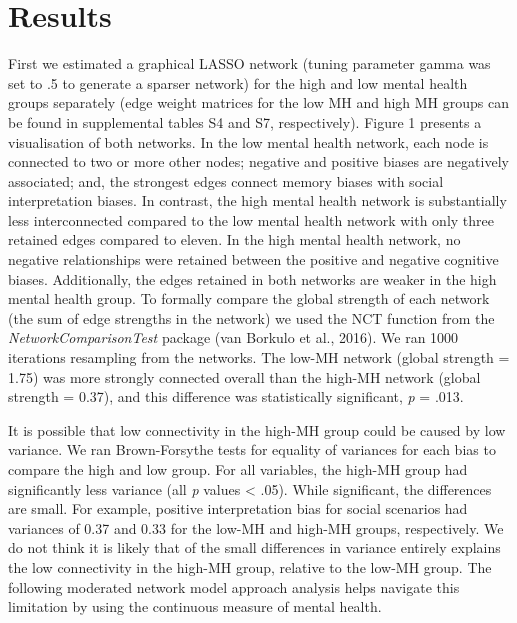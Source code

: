 \documentclass[
  english,
  man,floatsintext]{apa6}
\begin{document}
\hypertarget{results}{%
\section{Results}\label{results}}

First we estimated a graphical LASSO network (tuning parameter gamma was set to .5 to generate a sparser network) for the high and low mental health groups separately (edge weight matrices for the low MH and high MH groups can be found in supplemental tables S4 and S7, respectively). Figure 1 presents a visualisation of both networks. In the low mental health network, each node is connected to two or more other nodes; negative and positive biases are negatively associated; and, the strongest edges connect memory biases with social interpretation biases. In contrast, the high mental health network is substantially less interconnected compared to the low mental health network with only three retained edges compared to eleven. In the high mental health network, no negative relationships were retained between the positive and negative cognitive biases. Additionally, the edges retained in both networks are weaker in the high mental health group. To formally compare the global strength of each network (the sum of edge strengths in the network) we used the NCT function from the \emph{NetworkComparisonTest} package (van Borkulo et al., 2016). We ran 1000 iterations resampling from the networks. The low-MH network (global strength = 1.75) was more strongly connected overall than the high-MH network (global strength = 0.37), and this difference was statistically significant, \emph{p} = .013.

It is possible that low connectivity in the high-MH group could be caused by low variance. We ran Brown-Forsythe tests for equality of variances for each bias to compare the high and low group. For all variables, the high-MH group had significantly less variance (all \emph{p} values \textless{} .05). While significant, the differences are small. For example, positive interpretation bias for social scenarios had variances of 0.37 and 0.33 for the low-MH and high-MH groups, respectively. We do not think it is likely that of the small differences in variance entirely explains the low connectivity in the high-MH group, relative to the low-MH group. The following moderated network model approach analysis helps navigate this limitation by using the continuous measure of mental health.
\end{document}
